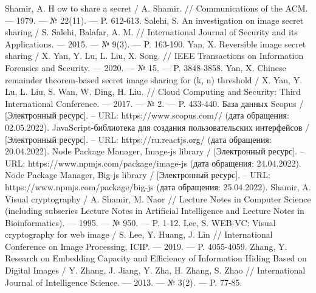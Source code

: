 \documentclass[a4paper,article,14pt]{extarticle}
\begin{document}
\newpage    
\begin{thebibliography}{1}
 Shamir, A. H ow to share a secret / A. Shamir. //  Communications of the ACM. — 1979. — № 22(11). — P. 612-613.
 Salehi, S. An investigation on image secret sharing / S. Salehi, Balafar, A. M. // International Journal of Security and its Applications. — 2015. — № 9(3). — P. 163-190.
 Yan, X. Reversible image secret sharing / X. Yan, Y. Lu, L. Liu, X. Song. // IEEE Transactions on Information Forensics and Security. — 2020. — № 15. — P. 3848-3858.
 Yan, X. Chinese remainder theorem-based secret image sharing for (k, n) threshold / X. Yan, Y. Lu, L. Liu, S. Wan, W. Ding, H. Liu. //   Cloud Computing and Security: Third International Conference. — 2017. — № 2. — P. 433-440.
 База данных Scopus / [Электронный ресурс]. – URL: https://www.scopus.com// (дата обращения: 02.05.2022).
 JavaScript-библиотека для создания пользовательских интерфейсов / [Электронный ресурс]. – URL: https://ru.reactjs.org/ (дата обращения: 20.04.2022).
 Node Package Manager, Image-js library / [Электронный ресурс]. – URL: https://www.npmjs.com/package/image-js (дата обращения: 24.04.2022).
 Node Package Manager, Big-js library / [Электронный ресурс]. – URL: https://www.npmjs.com/package/big-js (дата обращения: 25.04.2022).
 Shamir, A. Visual cryptography / A. Shamir, M. Naor // Lecture Notes in Computer Science (including subseries Lecture Notes in Artificial Intelligence and Lecture Notes in Bioinformatics). — 1995. — № 950. — P. 1-12.
 Lee, S. WEB-VC: Visual cryptography for web image / S. Lee, Y. Huang, J. Lin  //  International Conference on Image Processing, ICIP. — 2019. — P. 4055-4059.
 Zhang, Y. Research on Embedding Capacity and Efficiency of Information Hiding Based on Digital Images / Y. Zhang, J. Jiang, Y. Zha, H. Zhang, S. Zhao // International Journal of Intelligence Science. — 2013. — № 3(2). — P. 77-85.
\end{thebibliography}
\end{document}
